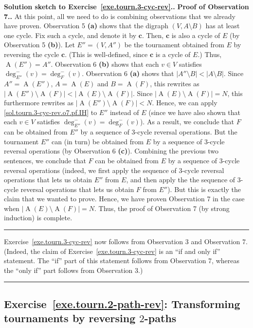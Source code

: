 \documentclass[numbers=enddot,12pt,final,onecolumn,notitlepage]{scrartcl}%
\theoremstyle{definition}
\newenvironment{proof}[1][Proof]{\noindent\textbf{#1.} }{\ \rule{0.5em}{0.5em}}
\newcommand{\abs}[1]{\left| #1 \right|}
\newcommand{\tup}[1]{\left( #1 \right)}
\newcommand{\arcs}[1]{\operatorname{A}\left( #1 \right)}
\begin{document}
\begin{proof}[Solution sketch to Exercise~\ref{exe.tourn.3-cyc-rev}.]
\begin{proof}[Proof of Observation 7.]
At this point, all we need to do is combining observations that
we already have proven. Observation 5 \textbf{(a)} shows that
the digraph $\tup{V, A \setminus B}$ has at least one
cycle. Fix such a cycle, and denote it by $\mathbf{c}$. Then,
$\mathbf{c}$ is also a cycle of $E$ (by Observation 5 \textbf{(b)}).
Let $E'' = \tup{V, A''}$ be the tournament obtained from $E$ by
reversing the cycle $\mathbf{c}$. (This is well-defined,
since $\mathbf{c}$ is a cycle of $E$.) Thus,
$\arcs{E''} = A''$. Observation 6 \textbf{(b)}
shows that each $v \in V$ satisfies
$\deg^-_{E''} \tup{v} = \deg^-_F \tup{v}$.
Observation 6 \textbf{(a)} shows that
$\abs{A'' \setminus B} < \abs{A \setminus B}$.
Since $A'' = \arcs{E''}$, $A = \arcs{E}$ and $B = \arcs{F}$,
this rewrites as
$\abs{\arcs{E''} \setminus \arcs{F}}
< \abs{\arcs{E} \setminus \arcs{F}}$.
Since $\abs{\arcs{E} \setminus \arcs{F}} = N$, this furthermore
rewrites as
$\abs{\arcs{E''} \setminus \arcs{F}} < N$. Hence, we can apply
\eqref{sol.tourn.3-cyc-rev.o7.pf.IH} to $E''$ instead of $E$ (since
we have also shown that each $v \in V$ satisfies
$\deg^-_{E''} \tup{v} = \deg^-_F \tup{v}$). As a result, we conclude
that $F$ can be obtained from $E''$ by a sequence of
$3$-cycle reversal operations. But the tournament $E''$ can (in
turn) be obtained from $E$ by a sequence of $3$-cycle reversal
operations (by Observation 6 \textbf{(c)}). Combining the previous
two sentences, we conclude that $F$ can be obtained from $E$ by
a sequence of $3$-cycle reversal operations (indeed, we first apply
the sequence of $3$-cycle reversal operations that lets us obtain
$E''$ from $E$, and then apply the
the sequence of $3$-cycle reversal operations that lets us obtain
$F$ from $E''$). But this is exactly the claim that we wanted to
prove. Hence, we have proven Observation 7 in the case when
$\abs{\arcs{E} \setminus \arcs{F}} = N$.
Thus, the proof of Observation 7 (by strong induction) is complete.
\end{proof}

Exercise~\ref{exe.tourn.3-cyc-rev} now follows from Observation 3
and Observation 7. (Indeed, the claim of
Exercise~\ref{exe.tourn.3-cyc-rev} is an ``if and only if''
statement. The ``if'' part of this statement follows from
Observation 7, whereas the ``only if'' part follows from
Observation 3.)
\end{proof}

\subsection{Exercise~\ref{exe.tourn.2-path-rev}: Transforming
tournaments by reversing $2$-paths}
\end{document}

